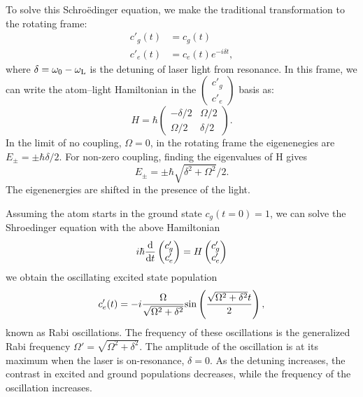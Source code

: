 To solve this Schro\"edinger equation, we make the traditional transformation to the rotating frame:
\begin{align}
c'_g(t) & = c_g(t)\\
c'_e(t) & = c_e(t) e^{-i\delta t}, 
\end{align}
where $\delta = \omega_0 - \omega_{\rm L}$ is the detuning of laser light from resonance. In this frame, we can write the atom--light Hamiltonian in the $\begin{pmatrix} c'_g \\ c'_e \end{pmatrix}$ basis as:
\begin{equation}
H = \hbar \begin{pmatrix} -\delta/2 & \Omega/2 \\ \Omega/2 & \delta/2 \end{pmatrix}.
\label{eqn:TwoLevelHam}
\end{equation}
In the limit of no coupling, $\Omega = 0$, in the rotating frame the eigenenegies are $E_{\pm} = \pm \hbar \delta/2$. For non-zero coupling, finding the eigenvalues of H gives 
\begin{equation}
E_{\pm} = \pm \hbar \sqrt{\delta^2 + \Omega^2}/2.
\label{eqn:TwoLevelEnergy}
\end{equation}
The eigenenergies are shifted in the presence of the light. 

Assuming the atom starts in the ground state $c_g(t=0)=1$, we can solve the Shroedinger equation with the above Hamiltonian
\begin{equation}
i\hbar \frac{{\rm d}}{{\rm d}t} \begin{pmatrix} c'_g \\ c'_e \end{pmatrix} = H \begin{pmatrix} c'_g \\ c'_e \end{pmatrix}
\end{equation}
we obtain the oscillating excited state population 
\begin{equation}
c'_e(t) = -i \frac{\Omega}{\sqrt{\Omega^2 + \delta^2}}{\rm sin}\left(\frac{\sqrt{\Omega^2 + \delta^2}t}{2}\right),
\label{eq:Rabi}
\end{equation} 
known as Rabi oscillations. The frequency of these oscillations is the generalized Rabi frequency $\Omega'=\sqrt{\Omega^2 + \delta^2}$. The amplitude of the oscillation is at its maximum when the laser is on-resonance, $\delta=0$. As the detuning increases, the contrast in excited and ground populations decreases, while the frequency of the oscillation increases. 

